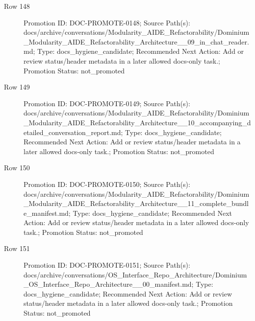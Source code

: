 \documentclass[9pt,a4paper,openany]{book}
\begin{document}
\begin{description}
\item[Row 148] Promotion ID: DOC-\allowbreak{}PROMOTE-\allowbreak{}0148; Source Path(s): docs/\allowbreak{}archive/\allowbreak{}conversations/\allowbreak{}Modularity\_\allowbreak{}AIDE\_\allowbreak{}Refactorability/\allowbreak{}Dominium\_\allowbreak{}Modularity\_\allowbreak{}AIDE\_\allowbreak{}Refactorability\_\allowbreak{}Architecture\_\allowbreak{}\_\allowbreak{}09\_\allowbreak{}in\_\allowbreak{}chat\_\allowbreak{}reader.\allowbreak{}md; Type: docs\_\allowbreak{}hygiene\_\allowbreak{}candidate; Recommended Next Action: Add or review status/\allowbreak{}header metadata in a later allowed docs-\allowbreak{}only task.\allowbreak{}; Promotion Status: not\_\allowbreak{}promoted
\item[Row 149] Promotion ID: DOC-\allowbreak{}PROMOTE-\allowbreak{}0149; Source Path(s): docs/\allowbreak{}archive/\allowbreak{}conversations/\allowbreak{}Modularity\_\allowbreak{}AIDE\_\allowbreak{}Refactorability/\allowbreak{}Dominium\_\allowbreak{}Modularity\_\allowbreak{}AIDE\_\allowbreak{}Refactorability\_\allowbreak{}Architecture\_\allowbreak{}\_\allowbreak{}10\_\allowbreak{}accompanying\_\allowbreak{}detailed\_\allowbreak{}conversation\_\allowbreak{}report.\allowbreak{}md; Type: docs\_\allowbreak{}hygiene\_\allowbreak{}candidate; Recommended Next Action: Add or review status/\allowbreak{}header metadata in a later allowed docs-\allowbreak{}only task.\allowbreak{}; Promotion Status: not\_\allowbreak{}promoted
\item[Row 150] Promotion ID: DOC-\allowbreak{}PROMOTE-\allowbreak{}0150; Source Path(s): docs/\allowbreak{}archive/\allowbreak{}conversations/\allowbreak{}Modularity\_\allowbreak{}AIDE\_\allowbreak{}Refactorability/\allowbreak{}Dominium\_\allowbreak{}Modularity\_\allowbreak{}AIDE\_\allowbreak{}Refactorability\_\allowbreak{}Architecture\_\allowbreak{}\_\allowbreak{}11\_\allowbreak{}complete\_\allowbreak{}bundle\_\allowbreak{}manifest.\allowbreak{}md; Type: docs\_\allowbreak{}hygiene\_\allowbreak{}candidate; Recommended Next Action: Add or review status/\allowbreak{}header metadata in a later allowed docs-\allowbreak{}only task.\allowbreak{}; Promotion Status: not\_\allowbreak{}promoted
\item[Row 151] Promotion ID: DOC-\allowbreak{}PROMOTE-\allowbreak{}0151; Source Path(s): docs/\allowbreak{}archive/\allowbreak{}conversations/\allowbreak{}OS\_\allowbreak{}Interface\_\allowbreak{}Repo\_\allowbreak{}Architecture/\allowbreak{}Dominium\_\allowbreak{}OS\_\allowbreak{}Interface\_\allowbreak{}Repo\_\allowbreak{}Architecture\_\allowbreak{}\_\allowbreak{}00\_\allowbreak{}manifest.\allowbreak{}md; Type: docs\_\allowbreak{}hygiene\_\allowbreak{}candidate; Recommended Next Action: Add or review status/\allowbreak{}header metadata in a later allowed docs-\allowbreak{}only task.\allowbreak{}; Promotion Status: not\_\allowbreak{}promoted

\end{description}
\end{document}
